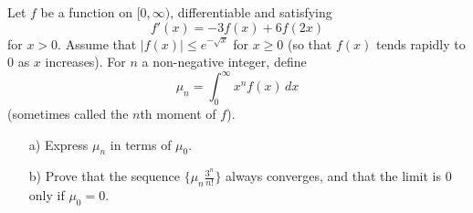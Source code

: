 Let $f$ be a function on $[0,\infty)$, differentiable and satisfying
\[
f'(x)=-3f(x)+6f(2x)
\]
for $x>0$. Assume that $|f(x)|\le e^{-\sqrt{x}}$ for $x\ge 0$ (so that
$f(x)$ tends rapidly to $0$ as $x$ increases).
For $n$ a non-negative integer, define
\[
\mu_n=\int_0^\infty x^n f(x)\,dx
\]
(sometimes called the $n$th moment of $f$).
\begin{enumerate}
\item[a)] Express $\mu_n$ in terms of $\mu_0$.
\item[b)] Prove that the sequence $\{\mu_n \frac{3^n}{n!}\}$ always converges,
and that the limit is $0$ only if $\mu_0=0$.
\end{enumerate}
